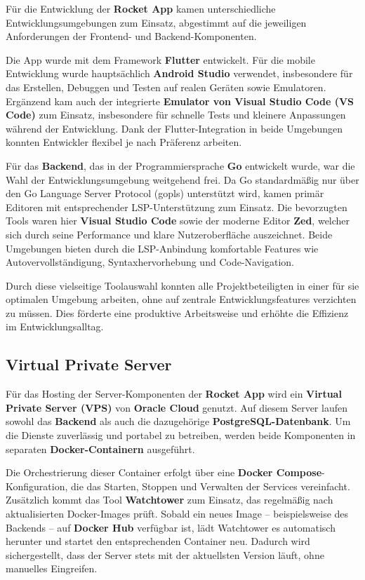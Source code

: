 \documentclass[11pt,a4paper]{article}
\begin{document}
Für die Entwicklung der \textbf{Rocket App} kamen unterschiedliche Entwicklungsumgebungen zum Einsatz, abgestimmt auf die jeweiligen Anforderungen der Frontend- und Backend-Komponenten.

Die App wurde mit dem Framework \textbf{Flutter} entwickelt. Für die mobile Entwicklung wurde hauptsächlich \textbf{Android Studio} verwendet, insbesondere für das Erstellen, Debuggen und Testen auf realen Geräten sowie Emulatoren. Ergänzend kam auch der integrierte \textbf{Emulator von Visual Studio Code (VS Code)} zum Einsatz, insbesondere für schnelle Tests und kleinere Anpassungen während der Entwicklung. Dank der Flutter-Integration in beide Umgebungen konnten Entwickler flexibel je nach Präferenz arbeiten.

Für das \textbf{Backend}, das in der Programmiersprache \textbf{Go} entwickelt wurde, war die Wahl der Entwicklungsumgebung weitgehend frei. Da Go standardmäßig nur über den Go Language Server Protocol (gopls) unterstützt wird, kamen primär Editoren mit entsprechender LSP-Unterstützung zum Einsatz. Die bevorzugten Tools waren hier \textbf{Visual Studio Code} sowie der moderne Editor \textbf{Zed}, welcher sich durch seine Performance und klare Nutzeroberfläche auszeichnet. Beide Umgebungen bieten durch die LSP-Anbindung komfortable Features wie Autovervollständigung, Syntaxhervorhebung und Code-Navigation.

Durch diese vielseitige Toolauswahl konnten alle Projektbeteiligten in einer für sie optimalen Umgebung arbeiten, ohne auf zentrale Entwicklungsfeatures verzichten zu müssen. Dies förderte eine produktive Arbeitsweise und erhöhte die Effizienz im Entwicklungsalltag.

\subsection{Virtual Private Server}

Für das Hosting der Server-Komponenten der \textbf{Rocket App} wird ein \textbf{Virtual Private Server (VPS)} von \textbf{Oracle Cloud} genutzt. Auf diesem Server laufen sowohl das \textbf{Backend} als auch die dazugehörige \textbf{PostgreSQL-Datenbank}. Um die Dienste zuverlässig und portabel zu betreiben, werden beide Komponenten in separaten \textbf{Docker-Containern} ausgeführt.

Die Orchestrierung dieser Container erfolgt über eine \textbf{Docker Compose}-Konfiguration, die das Starten, Stoppen und Verwalten der Services vereinfacht. Zusätzlich kommt das Tool \textbf{Watchtower} zum Einsatz, das regelmäßig nach aktualisierten Docker-Images prüft. Sobald ein neues Image – beispielsweise des Backends – auf \textbf{Docker Hub} verfügbar ist, lädt Watchtower es automatisch herunter und startet den entsprechenden Container neu. Dadurch wird sichergestellt, dass der Server stets mit der aktuellsten Version läuft, ohne manuelles Eingreifen.
\end{document}
